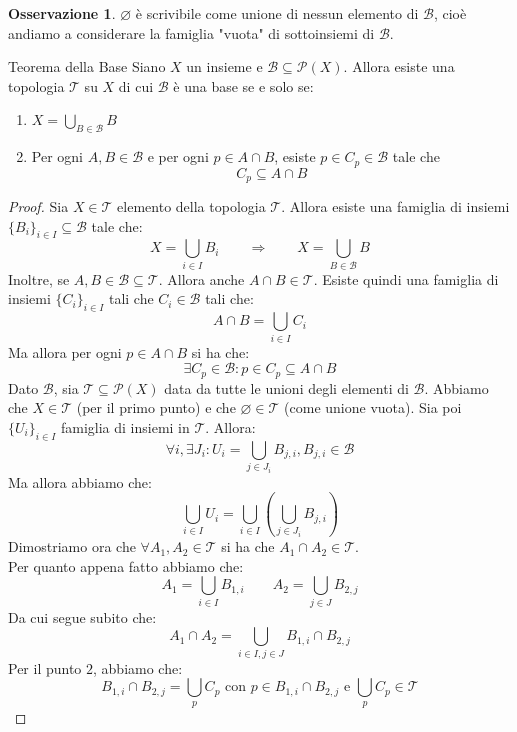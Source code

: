 \documentclass[11pt,a4paper,twoside]{article}
\theoremstyle{definition}
\newtheorem*{oss}{Osservazione}
\begin{document}
\begin{oss}
	$\varnothing$ è scrivibile come unione di nessun elemento di $\mathcal B$, cioè andiamo a considerare la famiglia "vuota" di sottoinsiemi di $\mathcal B$.
\end{oss}

\begin{thm}{Teorema della Base}{}\label{Base}
	Siano $X$ un insieme e $\mathcal B \subseteq \mathcal P(X)$. Allora esiste una topologia $\mathcal T$ su $X$ di cui $\mathcal B$ è una base se e solo se:
	\begin{enumerate}
		\item $X = \bigcup_{B \in \mathcal B}B$
		\item Per ogni $A, B \in \mathcal B$ e per ogni $p \in A \cap B$, esiste $p \in C_p \in \mathcal B$ tale che \[C_p \subseteq A \cap B\]
	\end{enumerate}
\end{thm}

\begin{proof}
	\fbox{$\Rightarrow$} Sia $X \in \mathcal T$ elemento della topologia $\mathcal T$. Allora esiste una famiglia di insiemi $\{B_i\}_{i \in I}\subseteq \mathcal B$ tale che:
	\[ X = \bigcup_{i \in I}B_i \qquad \Rightarrow \qquad X = \bigcup_{B \in \mathcal B}B\]
	Inoltre, se $A,B \in \mathcal B\subseteq \mathcal T$. Allora anche $A \cap B \in \mathcal T$. Esiste quindi una famiglia di insiemi $\{C_i\}_{i\in I}$ tali che $C_i \in \mathcal B$ tali che: \[A \cap B = \bigcup_{i \in I}C_i\]
	Ma allora per ogni $p \in A \cap B$ si ha che:
	\[\exists C_p \in \mathcal B: p \in C_p \subseteq A \cap B\]
	\fbox{$\Leftarrow$} Dato $\mathcal B$, sia $\mathcal T \subseteq \mathcal P(X)$ data da tutte le unioni degli elementi di $\mathcal B$. Abbiamo che $X \in \mathcal T$ (per il primo punto) e che $\varnothing \in \mathcal T$ (come unione vuota). Sia poi $\{U_i\}_{i \in I}$ famiglia di insiemi in $\mathcal T$. Allora:
	\[\forall i, \exists J_i: U_i = \bigcup_{j \in J_i} B_{j,i}, B_{j,i} \in \mathcal B\]
	Ma allora abbiamo che:
	\[\bigcup_{i \in I} U_i = \bigcup_{i \in I} \left( \bigcup_{j \in J_i}B_{j,i} \right)\]
	Dimostriamo ora che $\forall A_1, A_2 \in \mathcal T$ si ha che $A_1 \cap A_2 \in \mathcal T$.\\
	Per quanto appena fatto abbiamo che:
	\[ A_1 = \bigcup_{i \in I}B_{1,i} \qquad A_2 = \bigcup_{j \in J}B_{2,j}\]
	Da cui segue subito che:
	\[A_1 \cap A_2 = \bigcup_{i \in I, j \in J}B_{1,i}\cap B_{2,j}\]
	Per il punto $2$, abbiamo che:
	\[B_{1,i} \cap B_{2,j} = \bigcup_p C_p \text{ con }p \in B_{1,i}\cap B_{2,j}\text{ e } \bigcup_p C_p \in \mathcal T\]
\end{proof}
\end{document}
